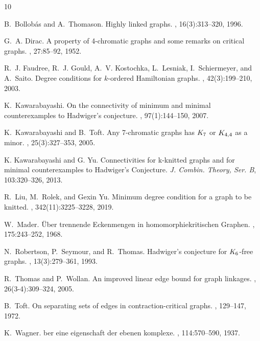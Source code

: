 \documentclass[11pt]{amsart}
\begin{document}
\begin{thebibliography}{10}

B.~Bollob{\'a}s and A.~Thomason.
\newblock Highly linked graphs.
, 16(3):313--320, 1996.

G.~A. Dirac.
\newblock A property of 4-chromatic graphs and some remarks on critical graphs.
, 27:85--92, 1952.

R.~J. Faudree, R.~J. Gould, A.~V. Kostochka, L.~Lesniak, I.~Schiermeyer, and A.~Saito.
\newblock Degree conditions for {$k$}-ordered {H}amiltonian graphs.
, 42(3):199--210, 2003.

K.~Kawarabayashi.
\newblock On the connectivity of minimum and minimal counterexamples to {H}adwiger's conjecture.
, 97(1):144--150, 2007.

K.~Kawarabayashi and B.~Toft.
\newblock Any 7-chromatic graphs has $K\sb 7$ or $K\sb {4,4}$ as a minor.
, 25(3):327--353, 2005.

K. Kawarabayashi and G. Yu. Connectivities for k-knitted graphs and for minimal counterexamples to Hadwiger’s Conjecture. {\em J. Combin. Theory, Ser. B}, 103:320–326, 2013.

R.~Liu, M.~Rolek, and Gexin Yu.
\newblock Minimum degree condition for a graph to be knitted.
, 342(11):3225--3228, 2019.

W.~Mader.
\newblock \"{U}ber trennende {E}ckenmengen in homomorphiekritischen {G}raphen.
, 175:243--252, 1968.

N.~Robertson, P.~Seymour, and R.~Thomas.
\newblock Hadwiger's conjecture for {$K\sb 6$}-free graphs.
, 13(3):279--361, 1993.

R.~Thomas and P.~Wollan.
\newblock An improved linear edge bound for graph linkages.
, 26(3-4):309--324, 2005.

B.~Toft.
\newblock On separating sets of edges in contraction-critical graphs.
, 129--147, 1972.

K.~Wagner.
ber eine eigenschaft der ebenen komplexe.
, 114:570--590, 1937.

\end{thebibliography}
\end{document}
